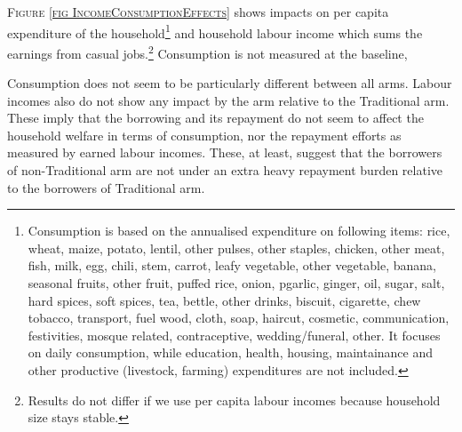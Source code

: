 	\textsc{\footnotesize Figure \ref{fig IncomeConsumptionEffects}} shows impacts on per capita expenditure of the household\footnote{Consumption is based on the annualised expenditure on following items: rice, wheat, maize, potato, lentil, other pulses, other staples, chicken, other meat, fish, milk, egg, chili, stem, carrot, leafy vegetable, other vegetable, banana, seasonal fruits, other fruit, puffed rice, onion, pgarlic, ginger, oil, sugar, salt, hard spices, soft spices, tea, bettle, other drinks, biscuit, cigarette, chew tobacco, transport, fuel wood, cloth, soap, haircut, cosmetic, communication, festivities, mosque related, contraceptive, wedding/funeral, other. It focuses on daily consumption, while education, health, housing, maintainance and other productive (livestock, farming) expenditures are not included. } and household labour income which sums the earnings from casual jobs.\footnote{Results do not differ if we use per capita labour incomes because household size stays stable. } Consumption is not measured at the baseline,  %

	Consumption does not seem to be particularly different between all arms. Labour incomes also do not show any impact by the arm relative to the \textsf{Traditional} arm. These imply that the borrowing and its repayment do not seem to affect the household welfare in terms of consumption, nor the repayment efforts as measured by earned labour incomes.  These, at least, suggest that the borrowers of non-\textsf{Traditional} arm are not under an extra heavy repayment burden relative to the borrowers of \textsf{Traditional} arm. 


